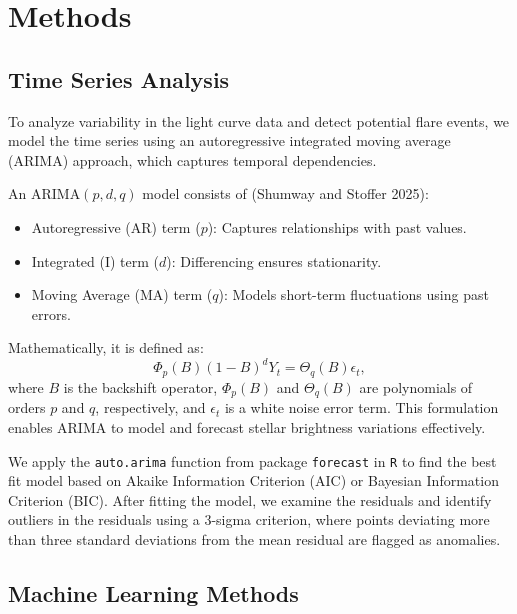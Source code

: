 \documentclass[
]{article}
\begin{document}
\section{Methods}\label{sec-methods}

\subsection{Time Series Analysis}\label{time-series-analysis}

To analyze variability in the light curve data and detect potential flare events, we model the time series using an autoregressive integrated moving average (ARIMA) approach, which captures temporal dependencies.

An ARIMA\((p,d,q)\) model consists of (Shumway and Stoffer 2025):

\begin{itemize}
    \item Autoregressive (AR) term ($p$): Captures relationships with past values.
    \item Integrated (I) term ($d$): Differencing ensures stationarity.
    \item Moving Average (MA) term ($q$): Models short-term fluctuations using past errors.
\end{itemize}

Mathematically, it is defined as:
\begin{equation}
    \Phi_p(B)(1 - B)^d Y_t = \Theta_q(B) \epsilon_t,
\end{equation}
where \(B\) is the backshift operator, \(\Phi_p(B)\) and \(\Theta_q(B)\) are polynomials of orders \(p\) and \(q\), respectively, and \(\epsilon_t\) is a white noise error term. This formulation enables ARIMA to model and forecast stellar brightness variations effectively.

We apply the \texttt{auto.arima} function from package \texttt{forecast} in \texttt{R} to find the best fit model based on Akaike Information Criterion (AIC) or Bayesian Information Criterion (BIC). After fitting the model, we examine the residuals and identify outliers in the residuals using a 3-sigma criterion, where points deviating more than three standard deviations from the mean residual are flagged as anomalies.

\subsection{Machine Learning Methods}\label{machine-learning-methods}
\end{document}
